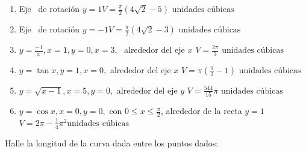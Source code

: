 {\begin{enumerate}
\item {Eje \ de rotación $y=1$}{$V=\frac{\pi }{2}\left( 4\sqrt{2}-5\right)\text{ unidades cúbicas}$}

\item {Eje \ de rotación $y=-1$}{$ V=\frac{\pi }{2}\left( 4%
	\sqrt{2}-3\right) \text{ unidades cúbicas}$}

\item {$y=\frac{-1}{x},x=1,y=0,x=3$, \ alrededor del eje $x$} {$V=\frac{2\pi }{3}\text{ unidades cúbicas}$}

\item {$y=\tan x,y=1,x=0,$ alrededor del eje $x$} {$V=\pi (\frac{\pi }{2}-1)\text{ unidades cúbicas}$}

\item {$y=\sqrt{x-1},x=5,y=0,$ alrededor del eje $y$} {$V=\frac{544}{15}\pi \text{ unidades cúbicas}$}

\item {$y=\cos x,x=0,y=0,$ con $0\leq x\leq \frac{\pi }{2}$, alrededor de la recta $y=1$} {$V=2\pi-\frac{1}{4} \pi^2 \text{unidades cúbicas}$} \\ \label{volfin}
\end{enumerate}
}


\begin{ejer}{Halle la longitud de la curva dada entre los puntos dados:}
\end{ejer}

